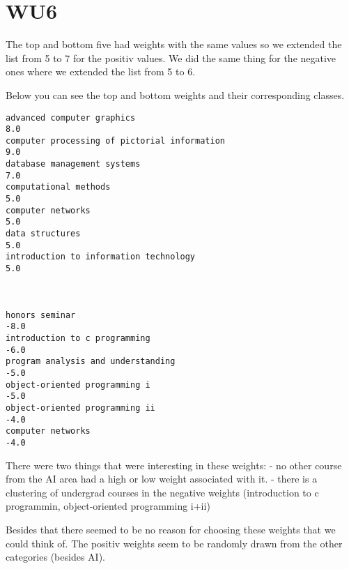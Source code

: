 \section*{WU6}
The top and bottom five had weights with the same values so we extended the list from 5 to 7 for the positiv values.
We did the same thing for the negative ones where we extended the list from 5 to 6.

Below you can see the top and bottom weights and their corresponding classes.

\begin{verbatim}
advanced computer graphics
8.0
computer processing of pictorial information
9.0
database management systems
7.0
computational methods
5.0
computer networks
5.0
data structures
5.0
introduction to information technology
5.0



honors seminar
-8.0
introduction to c programming
-6.0
program analysis and understanding
-5.0
object-oriented programming i
-5.0
object-oriented programming ii
-4.0
computer networks
-4.0
\end{verbatim}

There were two things that were interesting in these weights:
 - no other course from the AI area had a high or low weight associated with it.
 - there is a clustering of undergrad courses in the negative weights (introduction to c programmin, object-oriented programming i+ii)

Besides that there seemed to be no reason for choosing these weights that we could think of. The positiv weights seem to be randomly drawn from the other categories (besides AI).
